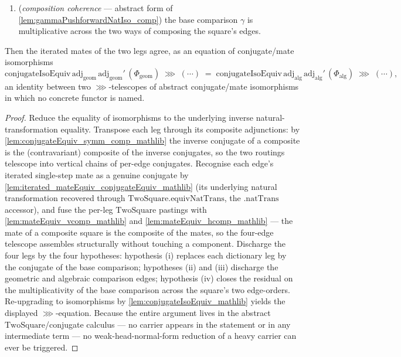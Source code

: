 \begin{lemma}
\begin{enumerate}
      \cref{lem:ring_square_glue_alg_leg_nat}) the conjugate of the extend-scalars reassociation equals
      the restrict-scalars reassociation;
    \item[(iv)] (\emph{composition coherence} --- abstract form of
      \cref{lem:gammaPushforwardNatIso_comp}) the base comparison \(\gamma\) is multiplicative across
      the two ways of composing the square's edges.
  \end{enumerate}
  Then the iterated mates of the two legs agree, as an equation of conjugate/mate isomorphisms
  \[
    \mathrm{conjugateIsoEquiv}\,\mathrm{adj}_{\mathrm{geom}}\,\mathrm{adj}_{\mathrm{geom}}'\,
      (\Phi_{\mathrm{geom}})
      \;\ggg\;
      (\cdots)
      \;=\;
    \mathrm{conjugateIsoEquiv}\,\mathrm{adj}_{\mathrm{alg}}\,\mathrm{adj}_{\mathrm{alg}}'\,
      (\Phi_{\mathrm{alg}})
      \;\ggg\;
      (\cdots),
  \]
  an identity between two \(\ggg\)-telescopes of abstract conjugate/mate isomorphisms in which no
  concrete functor is named.
  \begin{proof}
    Reduce the equality of isomorphisms to the underlying inverse natural-transformation equality.
    Transpose each leg through its composite adjunctions: by \cref{lem:conjugateEquiv_symm_comp_mathlib}
    the inverse conjugate of a composite is the (contravariant) composite of the inverse conjugates, so
    the two routings telescope into vertical chains of per-edge conjugates. Recognise each edge's
    iterated single-step mate as a genuine conjugate by
    \cref{lem:iterated_mateEquiv_conjugateEquiv_mathlib} (its underlying natural transformation recovered
    through \(\mathrm{TwoSquare.equivNatTrans}\), the \(\mathrm{.natTrans}\) accessor), and fuse the
    per-leg \(\mathrm{TwoSquare}\) pastings with \cref{lem:mateEquiv_vcomp_mathlib} and
    \cref{lem:mateEquiv_hcomp_mathlib} --- the mate of a composite square is the composite of the mates,
    so the four-edge telescope assembles structurally without touching a component. Discharge the four
    legs by the four hypotheses: hypothesis (i) replaces each dictionary leg by the conjugate of the
    base comparison; hypotheses (ii) and (iii) discharge the geometric and algebraic comparison edges;
    hypothesis (iv) closes the residual on the multiplicativity of the base comparison across the
    square's two edge-orders. Re-upgrading to isomorphisms by \cref{lem:conjugateIsoEquiv_mathlib} yields
    the displayed \(\ggg\)-equation. Because the entire argument lives in the abstract
    \(\mathrm{TwoSquare}\)/conjugate calculus --- no carrier appears in the statement or in any
    intermediate term --- no weak-head-normal-form reduction of a heavy carrier can ever be triggered.
  \end{proof}
\end{lemma}

